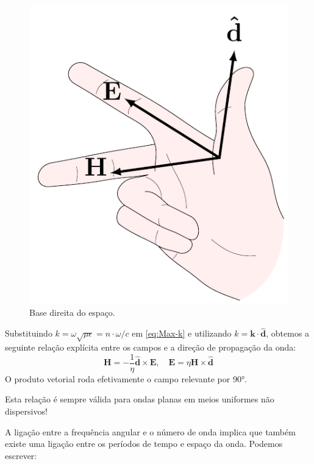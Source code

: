 \vspace{-0.75em}
\begin{minipage}[c]{0.35\linewidth}
    \begin{figure}[H]
        \centering
        \includegraphics[width=0.75\linewidth]{img/1/Right-hand-basis.pdf}
        \caption{Base direita do espaço.}
    \end{figure}
\end{minipage}\hfill
\begin{minipage}[c]{0.65\linewidth}
    Substituindo $k = \omega\sqrt{\mu\epsilon} = n \cdot \omega/c $ em \eqref{eq:Max-k} e utilizando $k = \mathbf{k}\cdot\mathbf{\hat{d}}$, obtemos a seguinte relação explícita entre os campos e a direção de propagação da onda:
    \begin{equation}
        \boxed{ \mathbf{H} = -\frac{1}{\eta}\mathbf{\hat{d}} \times \mathbf{E}, \quad \mathbf{E} = \eta\mathbf{H} \times \mathbf{\hat{d}} }
    \end{equation}
    O produto vetorial roda efetivamente o campo relevante por 90°.
    \begin{warning}
        Esta relação é sempre válida para ondas planas em meios uniformes não dispersivos!
    \end{warning}
\end{minipage}

\vspace{0.5em}
A ligação entre a frequência angular e o número de onda implica que também existe uma ligação entre os períodos de tempo e espaço da onda. Podemos escrever:

